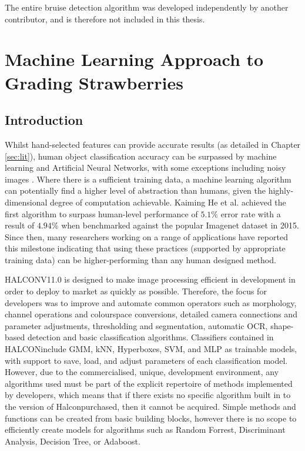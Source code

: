 \documentclass[fleqn,twoside,12pt]{report}
\begin{document}
The entire bruise detection algorithm was developed independently by another contributor, and is therefore not included in this thesis.



\newpage

\chapter{Machine Learning Approach to Grading Strawberries}
\label{sec:IV}

\section{Introduction}


Whilst hand-selected features can provide accurate results (as detailed in Chapter \ref{sec:lit}), human object classification accuracy can be surpassed by machine learning and Artificial Neural Networks, with some exceptions including noisy images \cite{dodge}. Where there is a sufficient training data, a machine learning algorithm can potentially find a higher level of abstraction than humans, given the highly-dimensional degree of computation achievable. Kaiming He et al.\cite{he2} achieved the first algorithm to surpass human-level performance of $5.1\%$ error rate with a result of $4.94\%$ when benchmarked against the popular Imagenet dataset in 2015. Since then, many researchers working on a range of applications have reported this milestone \cite{geirhos, saon, xiong, han} indicating that using these practices (supported by appropriate training data) can be higher-performing than any human designed method. 

HALCON\texttrademark V11.0 is designed to make image processing efficient in development in order to deploy to market as quickly as possible. Therefore, the focus for developers was to improve and automate common operators such as morphology, channel operations and colourspace conversions, detailed camera connections and parameter adjustments, thresholding and segmentation, automatic OCR, shape-based detection and basic classification algorithms. Classifiers contained in HALCON\texttrademark include GMM, kNN, Hyperboxes, SVM, and MLP as trainable models, with support to save, load, and adjust parameters of each classification model. However, due to the commercialised, unique, development environment, any algorithms used must be part of the explicit repertoire of methods implemented by developers, which means that if there exists no specific algorithm built in to the version of Halcon\texttrademark purchased, then it cannot be acquired. Simple methods and functions can be created from basic building blocks, however there is no scope to efficiently create models for algorithms such as Random Forrest, Discriminant Analysis, Decision Tree, or Adaboost. 
\end{document}
